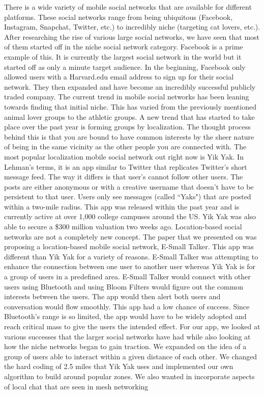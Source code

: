 There is a wide variety of mobile social networks that are available for different platforms. These social networks range from being ubiquitous (Facebook, Instagram, Snapchat, Twitter, etc.) to incredibly niche (targeting cat lovers, etc.). After researching the rise of various large social networks, we have seen that most of them started off in the niche social network category. Facebook is a prime example of this. It is currently the largest social network in the world but it started off as only a minute target audience. In the beginning, Facebook only allowed users with a Harvard.edu email address to sign up for their social network. They then expanded and have become an incredibly successful publicly traded company.
The current trend in mobile social networks has been leaning towards finding that initial niche. This has varied from the previously mentioned animal lover groups to the athletic groups. A new trend that has started to take place over the past year is forming groups by localization. The thought process behind this is that you are bound to have common interests by the sheer nature of being in the same vicinity as the other people you are connected with. The most popular localization mobile social network out right now is Yik Yak. In Lehman's terms, it is an app similar to Twitter that replicates Twitter's short message feed. The way it differs is that user's cannot follow other users. The posts are either anonymous or with a creative username that doesn't have to be persistent to that user. Users only see messages (called ``Yaks") that are posted within a two-mile radius. This app was released within the past year and is currently active at over 1,000 college campuses around the US. Yik Yak was also able to secure a \$300 million valuation two weeks ago. 
Location-based social networks are not a completely new concept. The paper that we presented on was proposing a location-based mobile social network, E-Small Talker. This app was different than Yik Yak for a variety of reasons. E-Small Talker was attempting to enhance the connection between one user to another user whereas Yik Yak is for a group of users in a predefined area. E-Small Talker would connect with other users using Bluetooth and using Bloom Filters would figure out the common interests between the users. The app would then alert both users and conversation would flow smoothly. This app had a low chance of success. Since Bluetooth's range is so limited, the app would have to be widely adopted and reach critical mass to give the users the intended effect.
For our app, we looked at various successes that the larger social networks have had while also looking at how the niche networks began to gain traction. We expanded on the idea of a group of users able to interact within a given distance of each other. We changed the hard coding of 2.5 miles that Yik Yak uses and implemented our own algorithm to build around popular zones.   We also wanted in incorporate aspects of local chat that are seen in mesh networking~\cite{raniwala2005architecture}